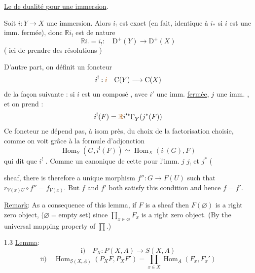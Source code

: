 \uline{Le  de dualité pour une immersion}.


Soit $i:Y\longrightarrow X$ une immersion.
Alors $i_!$ est exact (en fait, identique à $i_*$ si
$i$ est une imm. fermée), donc
$\mathbb{R}i_!$ est de nature 
\[
\mathbb{R}i_!=i_!:\quad \mathrm{D}^+(Y)\longrightarrow\mathrm{D}^+(X)
\]
( ici de prendre des résolutions )

D'autre part, on définit un foncteur
\[
i^!:\deleted{\unsure{i}}\quad \mathrm{C}(Y)\longrightarrow\mathrm{C}(X)
\]
de la façon suivante : si $i$ est un
composé
, avec $i'$ une
imm. \uline{fermée}, $j$ une imm. ,
et on prend :
\[
i^!(F)=\deleted{\unsure{\mathbb{R}}}i'^*\underline{\Gamma}_Y(j^*(F))
\]
Ce foncteur ne dépend pas, à isom 
près, du choix de la factorisation choisie,
comme on voit  grâce à la
formule d'adjonction
\[
\operatorname{Hom}_Y(G,i^!(F))\simeq\operatorname{Hom}_X(i_!(G),F)
\]
qui dit que $i^!$ .
Comme    un 
canonique de cette  pour 
l'imm.  $j$  $j_!$ et $j^*$ (


sheaf, there is therefore a unique morphism $f'':G\longrightarrow F(U)$ such
that $r_{V(x)U}\circ f''=f_{V(x)}$. But $f$ and $f'$ both satisfy this
condition and hence $f=f'$.

\uline{Remark}: As a consequence of this lemma, if $F$ is a sheaf then
$F(\varnothing)$ is a right zero object, ($\varnothing={}$empty set) since
$\prod_{x\in\varnothing}F_x$ is a
right zero object. (By the universal mapping property of $\prod$.)

1.3 \uline{Lemma}:
\[
\text{i)}\quad P_X:\underline{P}(X,\underline{A})\longrightarrow\underline{S}(X,\underline{A})
\]
\[
\text{ii)}\quad
\operatorname{Hom}_{\underline{S}(X,\underline{A})}(P_XF,P_XF')
=\prod_{x\in X}\operatorname{Hom}_{\underline{A}}(F_x,F_x')
\]

